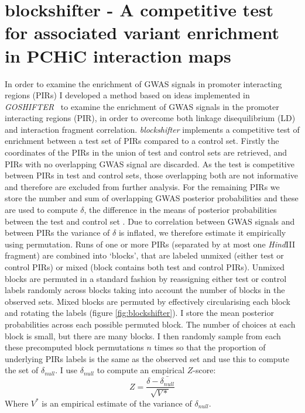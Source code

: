 \documentclass[a4paper,11pt]{report}
\begin{document}
\section{blockshifter - A competitive test for associated variant enrichment in PCHiC interaction maps}
In order to examine the enrichment of GWAS signals in promoter interacting regions (PIRs) I developed a method based on ideas implemented in \textit{GOSHIFTER}~\citep{Trynka2015-wz} to examine the enrichment of GWAS signals in the promoter interacting regions (PIR), in order to overcome both linkage disequilibrium (LD) and interaction fragment correlation. \textit{blockshifter} implements a competitive test of enrichment between a test set of PIRs compared to a control set. Firstly the coordinates of the PIRs in the union of test and control sets are retrieved, and PIRs with no overlapping GWAS signal  are discarded. As the test is competitive between PIRs in test and control sets, those overlapping both are not informative and therefore are excluded from further analysis. For the remaining PIRs we store the number and sum of overlapping GWAS posterior probabilities and these are used to compute $\delta$, the difference in the means of posterior probabilities between the test and control set . Due to correlation between GWAS signals and between PIRs the variance of $\delta$ is inflated, we therefore estimate it empirically using permutation.  Runs of one or more PIRs (separated by at most one \textit{Hind}III fragment) are combined into ‘blocks’, that are labeled unmixed (either test or control PIRs) or mixed (block contains both test and control PIRs).  Unmixed blocks are permuted in a standard fashion by reassigning either test or control labels randomly across blocks taking into account the number of blocks in the observed sets. Mixed blocks are permuted by effectively circularising each block and rotating the labels (figure \ref{fig:blockshifter}). I store the mean posterior probabilities across each possible permuted block. The number of choices at each block is small, but there are many blocks. I then randomly sample from each these precomputed block permutations $n$ times so that the proportion of underlying PIRs labels is the same as the observed set and use this to compute the set of $\delta_{null}$. I use $\delta_{null}$ to compute an empirical $Z$-score:
\begin{equation}
Z = \frac{\delta - \bar{\delta_{null}}}{\sqrt{V*}}
\end{equation}
Where $V^{*}$ is an empirical estimate of the variance of $\delta_{null}$. 
\end{document}
